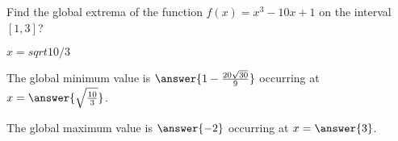 \documentclass{ximera}
\begin{document}
\begin{exercise}

Find the global extrema of the function $f(x) = x^3-10x+1$ on the interval
$[1,3]$?

$x = sqrt{10/3}$

The global minimum value is $\answer{1-\frac{20\sqrt{30}}{9}}$ occurring at $x = \answer{\sqrt{\frac{10}{3}}}$.

The global maximum value is $\answer{-2}$ occurring at $x = \answer{3}$.

\end{exercise}
\end{document}
